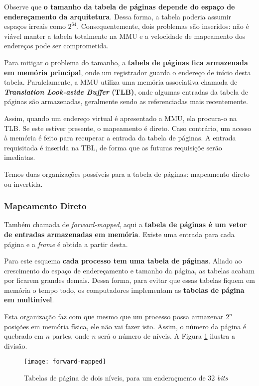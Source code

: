 Observe que \textbf{o tamanho da tabela de páginas depende do espaço de endereçamento da arquitetura}. Dessa forma, a tabela poderia assumir espaços irreais como $2^{64}$. Consequentemente, dois problemas são inseridos: não é viável manter a tabela totalmente na MMU e a velocidade de mapeamento dos endereços pode ser comprometida.

Para mitigar o problema do tamanho, a \textbf{tabela de páginas fica armazenada em memória principal}, onde um registrador guarda o endereço de início desta tabela. Paralelamente, a MMU utiliza uma memória associativa chamada de \textbf{\textit{Translation Look-aside Buffer} (TLB)}, onde algumas entradas da tabela de páginas são armazenadas, geralmente sendo as referenciadas mais recentemente.

Assim, quando um endereço virtual é apresentado a MMU, ela procura-o na TLB. Se este estiver presente, o mapeamento é direto. Caso contrário, um acesso à memória é feito para recuperar a entrada da tabela de páginas. A entrada requisitada é inserida na TBL, de forma que as futuras requisiçõe serão imediatas.

Temos duas organizações possíveis para a tabela de páginas: mapeamento direto ou invertida.

\subsubsection{Mapeamento Direto}
Também chamada de \textit{forward-mapped}, aqui a \textbf{tabela de páginas é um vetor de entradas armazenadas em memória}. Existe uma entrada para cada página e a \textit{frame} é obtida a partir desta.

Para este esquema \textbf{cada processo tem uma tabela de páginas}. Aliado ao crescimento do espaço de endereçamento e tamanho da página, as tabelas acabam por ficarem grandes demais. Dessa forma, para evitar que essas tabelas fiquem em memória o tempo todo, os computadores implementam as \textbf{tabelas de página em  multinível}.

Esta organização faz com que mesmo que um processo possa armazenar $2^n$ posições em memória física, ele não vai fazer isto. Assim, o número da página é quebrado em $n$ partes, onde $n$ será o número de níveis. A Figura \ref{fig:forward-mapped} ilustra a divisão.

\begin{figure}[h]
  \centering
  \texttt{[image: forward-mapped]}
  \caption{Tabelas de página de dois níveis, para um enderaçmento de 32 \textit{bits}}
  \label{fig:forward-mapped}
\end{figure}


